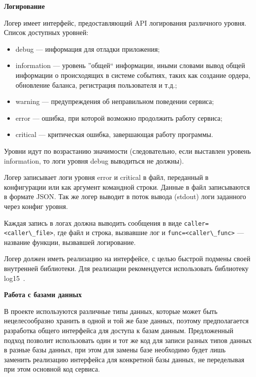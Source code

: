 \textbf{Логирование}

Логер имеет интерфейс, предоставляющий API логирования различного уровня. Список доступных уровней:

\begin{itemize}
    \item debug — информация для отладки приложения;
    \item information  — уровень ''общей`` информации, иными словами вывод общей информации о происходящих в системе событиях, таких как создание ордера, обновление баланса, регистрация пользователя и т.д.;
    \item warning  — предупреждения об неправильном поведении сервиса;
    \item error — ошибка, при которой возможно продолжить работу сервиса;
    \item critical  — критическая ошибка, завершающая работу программы.
\end{itemize}

Уровни идут по возрастанию значимости (следовательно, если выставлен уровень information, то логи уровня debug выводиться не должны).

Логер записывает логи уровня error и critical в файл, переданный в конфигурации или как аргумент командной строки. Данные в файл записываются в формате JSON. Так же логер выводит в поток вывода (stdout) логи заданного через конфиг уровня.

Каждая запись в логах должна выводить сообщения в виде \lstinline{caller=<caller\_file>}, где файл и строка, вызвавшие лог и \lstinline{func=<caller\_func>} — название функции, вызвавшей логирование.

Логер должен иметь реализацию на интерфейсе, с целью быстрой подмены своей внутренней библиотеки. Для реализации рекомендуется использовать библиотеку log15~\cite{log_lib}.

\textbf{Работа с базами данных}

В проекте используются различные типы данных, которые может быть нецелесообразно хранить в одной и той же базе данных, поэтому предполагается разработка общего интерфейса для доступа к базам данным. Предложенный подход позволит использовать один и тот же код для записи разных типов данных в разные базы данных, при этом для замены базе необходимо будет лишь заменить реализацию интерфейса для конкретной базы данных, не переделывая при этом основной код сервиса.

